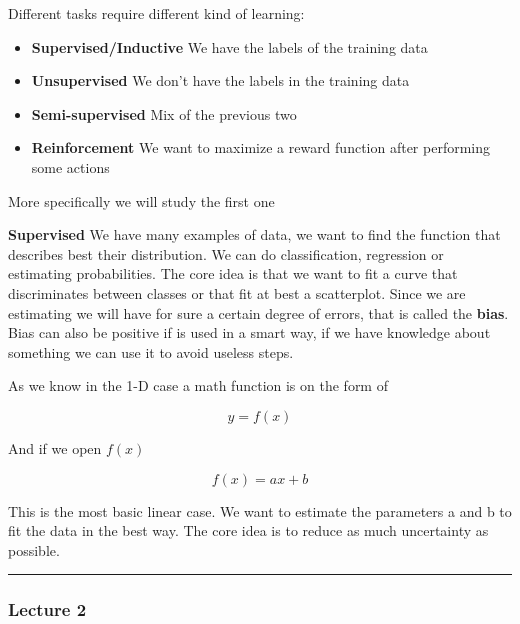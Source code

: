 \vspace{10pt}

Different tasks require different kind of learning:

\begin{itemize}
    \item \textbf{Supervised/Inductive} \ra We have the labels of the training data
    \item \textbf{Unsupervised} \ra We don't have the labels in the training data
    \item \textbf{Semi-supervised} \ra Mix of the previous two
    \item \textbf{Reinforcement} \ra We want to maximize a reward function after performing some actions
\end{itemize}

More specifically we will study the first one

\vspace{10pt}

\textbf{Supervised} \ra We have many examples of data, we want to find the function that describes best their distribution. We can do classification, regression or estimating probabilities. The core idea is that we want to fit a curve that discriminates between classes or that fit at best a scatterplot. Since we are estimating we will have for sure a certain degree of errors, that is called the \textbf{bias}. Bias can also be positive if is used in a smart way, if we have knowledge about something we can use it to avoid useless steps.

\vspace{10pt}

As we know in the 1-D case a math function is on the form of 

\begin{equation}
    y = f(x)
\end{equation}

And if we open $f(x)$

\begin{equation}
    f(x) = ax + b
\end{equation}

This is the most basic linear case. We want to estimate the parameters a and b to fit the data in the best way. The core idea is to reduce as much uncertainty as possible.

\hrule

\subsubsection{Lecture 2}

